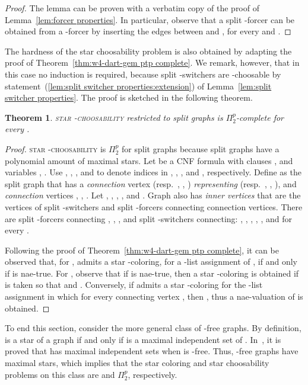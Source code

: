\documentclass[a4paper, 11pt, oneside]{article}
\newtheorem{theorem}{Theorem}
\newcommand{\stchose}[1]{\textsc{star -choosability}}
\newcommand{\ptwop}{\ensuremath{\Pi^p_2}\xspace}
\let\Definition=\emph
\begin{document}
\begin{proof}
  The lemma can be proven with a verbatim copy of the proof of Lemma~\ref{lem:forcer properties}.  In particular, observe that a split -forcer can be obtained from a -forcer by inserting the edges between  and , for every  and .  
\end{proof}

The hardness of the star choosability problem is also obtained by adapting the proof of Theorem~\ref{thm:w4-dart-gem ptp complete}.  We remark, however, that in this case no induction is required, because split -switchers are -choosable by statement~(\ref{lem:split switcher properties:extension}) of Lemma~\ref{lem:split switcher properties}.  The proof is sketched in the following theorem.


\begin{theorem}\label{thm:split stchose}
 \stchose{k} restricted to split graphs is \ptwop-complete for every .
\end{theorem}

\begin{proof}
 \stchose{k} is \ptwop for split graphs because split graphs have a polynomial amount of maximal stars.  Let  be a CNF formula with  clauses , and  variables , .  Use , , , and  to denote indices in , , , and , respectively.  Define  as the split graph that has a \Definition{connection} vertex  (resp.\ , , ) \Definition{representing}  (resp.\ , , ), and  \Definition{connection} vertices , , .  Let , , , , and .  Graph  also has \Definition{inner vertices} that are the vertices of split -switchers and split -forcers connecting connection vertices.  There are split -forcers connecting , , , and split -switchers connecting: , , , , , and  for every .  

 Following the proof of Theorem~\ref{thm:w4-dart-gem ptp complete}, it can be observed that, for ,  admits a star -coloring, for a -list assignment  of , if and only if  is nae-true.  For , observe that if  is nae-true, then a star -coloring  is obtained if  is taken so that  and .  Conversely, if  admits a star -coloring for the -list assignment in which  for every connecting vertex , then , thus a nae-valuation of  is obtained.
\end{proof}

To end this section, consider the more general class of -free graphs.  By definition,  is a star of a graph  if and only if  is a maximal independent set of .  In~\cite{FarberDM1989}, it is proved that  has  maximal independent sets when  is -free.  Thus, -free graphs have  maximal stars, which implies that the star coloring and star choosability problems on this class are \NP and \ptwop, respectively.  
\end{document}
